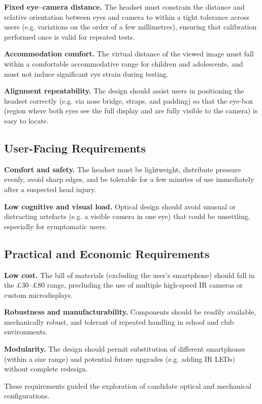 \textbf{Fixed eye--camera distance.} The headset must constrain the distance and relative orientation between eyes and camera to within a tight tolerance across users (e.g. variations on the order of a few millimetres), ensuring that calibration performed once is valid for repeated tests.

\textbf{Accommodation comfort.} The virtual distance of the viewed image must fall within a comfortable accommodative range for children and adolescents, and must not induce significant eye strain during testing.

\textbf{Alignment repeatability.} The design should assist users in positioning the headset correctly (e.g. via nose bridge, straps, and padding) so that the eye-box (region where both eyes see the full display and are fully visible to the camera) is easy to locate.

\subsection{User-Facing Requirements}

\textbf{Comfort and safety.} The headset must be lightweight, distribute pressure evenly, avoid sharp edges, and be tolerable for a few minutes of use immediately after a suspected head injury.

\textbf{Low cognitive and visual load.} Optical design should avoid unusual or distracting artefacts (e.g. a visible camera in one eye) that could be unsettling, especially for symptomatic users.

\subsection{Practical and Economic Requirements}

\textbf{Low cost.} The bill of materials (excluding the user's smartphone) should fall in the £30--£80 range, precluding the use of multiple high-speed IR cameras or custom microdisplays.

\textbf{Robustness and manufacturability.} Components should be readily available, mechanically robust, and tolerant of repeated handling in school and club environments.

\textbf{Modularity.} The design should permit substitution of different smartphones (within a size range) and potential future upgrades (e.g. adding IR LEDs) without complete redesign.

These requirements guided the exploration of candidate optical and mechanical configurations.



